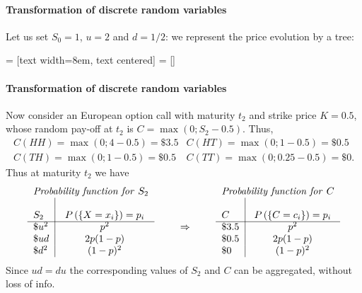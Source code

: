 \documentclass[smaller]{beamer}\usepackage[]{graphicx}\usepackage[]{color}
\renewcommand{\Pr}{P}
\begin{document}
\begin{frame}{\secname}
\framesubtitle{Transformation of discrete random variables}
\begin{example}[continued]
Let us set $S_0=1$, $u=2$ and $d=1/2$: we represent the price evolution by a tree:


%
 = [text width=8em, text centered]
 = []
\end{example}
\end{frame}%



\begin{frame}{\secname}
\framesubtitle{Transformation of discrete random variables}
  \begin{example}[continued]
  Now consider an European option call with maturity $t_2$ and strike price $K=0.5$, whose random pay-off at $t_2$ is $C=\max(0;S_2-0.5)$. Thus,
  \begin{eqnarray*}
  C(HH)=\max(0;4-0.5)=\$ 3.5 & C(HT)=\max(0;1-0.5)=\$ 0.5 \\
  C(TH)=\max(0;1-0.5)=\$ 0.5 & C(TT)=\max(0;0.25-0.5)=\$ 0.
  \end{eqnarray*}
  Thus at maturity $t_2$ we have
  \begin{equation*}
  \begin{tabular}{l|cll|c}
  \multicolumn{2}{l}{\emph{Probability function for }$S_2$} &  &
  \multicolumn{2}{l}{\emph{Probability function for }$C$} \\
  &  &  &  &  \\
  $S_2$ & $\Pr \left(\{ X=x_{i} \}\right) =p_{i}$ &  & $C$ & $\Pr \left(\{
  C=c_{i}  \}\right) =p_{i}$ \\ \cline{1-2}\cline{4-5}
  $\$ u^2$ & $p^2$ & $\qquad \Rightarrow \qquad $ & $\$ 3.5$ & $p^2$
  \\
  $\$ ud$ & $2p(1-p)$ &  & $\$ 0.5$ & $2p(1-p)$ \\
  $\$ d^2$ & $(1-p)^2$  &  & $\$ 0$ & $(1-p)^2$%
  \end{tabular}%
  \end{equation*}
  \tiny{Since $ud=du$ the corresponding values of $S_2$ and $C$ can be aggregated, without loss of info.}
  \end{example}
\end{frame}%
\end{document}
